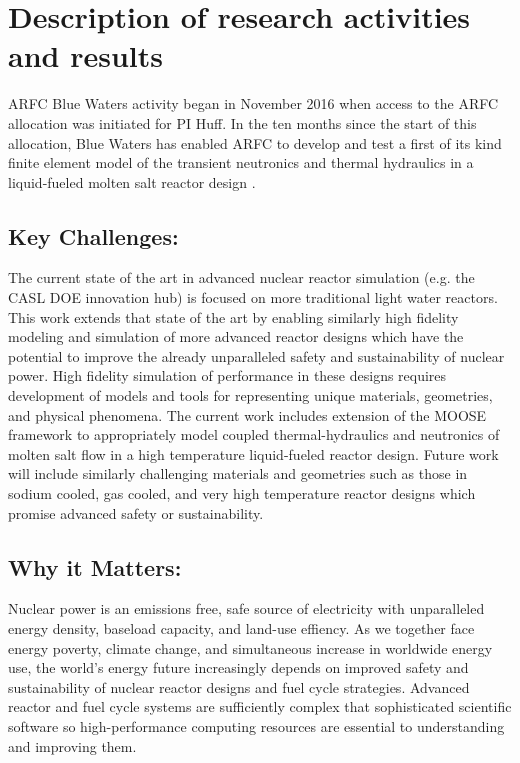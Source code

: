 \documentclass[letterpaper]{article}
\begin{document}
\section{Description of research activities and results}

ARFC Blue Waters activity began in November 2016 when access to the ARFC 
allocation was initiated for PI Huff.  In the ten months since the start of 
this allocation, Blue Waters has enabled ARFC to develop and test a first of 
its kind finite element model of the transient neutronics and thermal 
hydraulics in a liquid-fueled molten salt reactor design 
\cite{lindsay_moltres_2017}. 

\subsection{Key Challenges:}
The current state of the art in advanced nuclear reactor simulation (e.g. the
CASL DOE innovation hub) is focused on more traditional light water reactors.
This work extends that state of the art by enabling similarly high fidelity
modeling and simulation of more advanced reactor designs which have the
potential to improve the already unparalleled safety and sustainability of
nuclear power. High fidelity simulation of performance in these designs
requires development of models and tools for representing unique materials,
geometries, and physical phenomena.  The current work includes extension of the
MOOSE framework to appropriately model coupled thermal-hydraulics and
neutronics of molten salt flow in a high temperature liquid-fueled reactor
design. Future work will include similarly challenging materials and geometries
such as those in sodium cooled, gas cooled, and very high temperature reactor
designs which promise advanced safety or sustainability.

\subsection{Why it Matters:} 


Nuclear power is an emissions free, safe source of electricity with
unparalleled energy density, baseload capacity, and land-use effiency. 
As we together face energy poverty, climate change, and simultaneous increase
in worldwide energy use, the world's energy future increasingly depends on
improved safety and sustainability of nuclear reactor designs and fuel cycle
strategies. Advanced reactor and fuel cycle systems are sufficiently complex
that sophisticated scientific software so high-performance computing resources
are essential to understanding and improving them.
\end{document}
